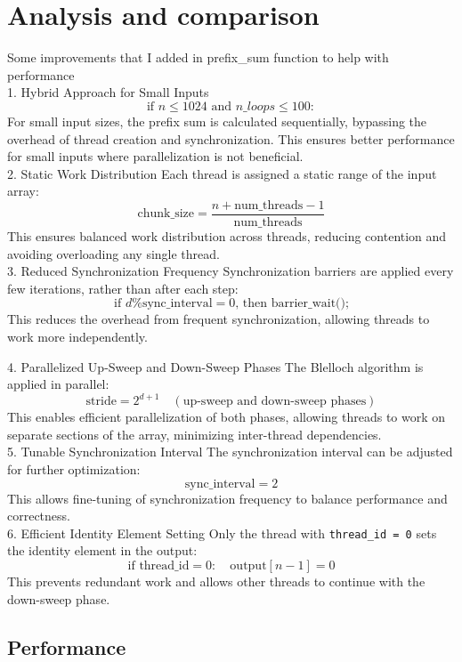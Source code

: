 \documentclass[letterpaper,12pt]{article}
\theoremstyle{remark}
\begin{document}
\section{Analysis and comparison}
Some improvements that I added in prefix\_sum function to help with performance  \\
1. Hybrid Approach for Small Inputs
\[
\text{if } n \leq 1024 \text{ and } n\_loops \leq 100:
\]
For small input sizes, the prefix sum is calculated sequentially, bypassing the overhead of thread creation and synchronization. This ensures better performance for small inputs where parallelization is not beneficial.\\

2. Static Work Distribution
Each thread is assigned a static range of the input array:
\[
\text{chunk\_size} = \frac{n + \text{num\_threads} - 1}{\text{num\_threads}}
\]
This ensures balanced work distribution across threads, reducing contention and avoiding overloading any single thread.\\

3. Reduced Synchronization Frequency
Synchronization barriers are applied every few iterations, rather than after each step:
\[
\text{if } d \% \text{sync\_interval} = 0 \text{, then barrier\_wait();}
\]
This reduces the overhead from frequent synchronization, allowing threads to work more independently.

4. Parallelized Up-Sweep and Down-Sweep Phases
The Blelloch algorithm is applied in parallel:
\[
\text{stride} = 2^{d+1} \quad (\text{up-sweep and down-sweep phases})
\]
This enables efficient parallelization of both phases, allowing threads to work on separate sections of the array, minimizing inter-thread dependencies.\\

5. Tunable Synchronization Interval
The synchronization interval can be adjusted for further optimization:
\[
\text{sync\_interval} = 2
\]
This allows fine-tuning of synchronization frequency to balance performance and correctness.\\

6. Efficient Identity Element Setting
Only the thread with \texttt{thread\_id = 0} sets the identity element in the output:
\[
\text{if } \text{thread\_id} = 0: \quad \text{output}[n-1] = 0
\]
This prevents redundant work and allows other threads to continue with the down-sweep phase.

\subsection{Performance}
\end{document}
